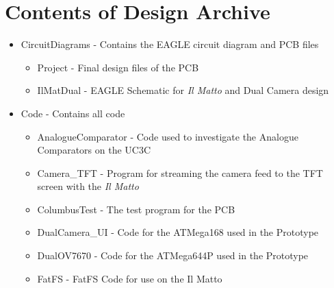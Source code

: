\chapter{Contents of Design Archive} \label{Appendix:Contents}
\begin{itemize}
\item CircuitDiagrams - Contains the EAGLE circuit diagram and PCB files
\begin{itemize}
\item Project - Final design files of the PCB
\item IlMatDual - EAGLE Schematic for \textit{Il Matto} and Dual Camera design
\end{itemize}
\item Code - Contains all code
\begin{itemize}
\item AnalogueComparator - Code used to investigate the Analogue Comparators on the UC3C
\item Camera\_TFT - Program for streaming the camera feed to the TFT screen with the \textit{Il Matto}
\item ColumbusTest - The test program for the PCB
\item DualCamera\_UI - Code for the ATMega168 used in the Prototype
\item DualOV7670 - Code for the ATMega644P used in the Prototype
\item FatFS - FatFS Code for use on the Il Matto 

\end{itemize}
\end{itemize}
